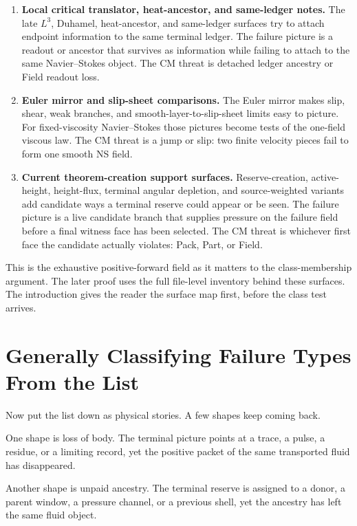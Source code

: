 \documentclass[11pt]{article}
\begin{document}
\begin{enumerate}[leftmargin=2em]
\item \textbf{Local critical translator, heat-ancestor, and same-ledger notes.}
The late \(L^3\), Duhamel, heat-ancestor, and same-ledger surfaces try to attach endpoint information to the same terminal ledger.
The failure picture is a readout or ancestor that survives as information while failing to attach to the same Navier--Stokes object.
The CM threat is detached ledger ancestry or Field readout loss.

\item \textbf{Euler mirror and slip-sheet comparisons.}
The Euler mirror makes slip, shear, weak branches, and smooth-layer-to-slip-sheet limits easy to picture.
For fixed-viscosity Navier--Stokes those pictures become tests of the one-field viscous law.
The CM threat is a jump or slip: two finite velocity pieces fail to form one smooth NS field.

\item \textbf{Current theorem-creation support surfaces.}
Reserve-creation, active-height, height-flux, terminal angular depletion, and source-weighted variants add candidate ways a terminal reserve could appear or be seen.
The failure picture is a live candidate branch that supplies pressure on the failure field before a final witness face has been selected.
The CM threat is whichever first face the candidate actually violates: Pack, Part, or Field.
\end{enumerate}

This is the exhaustive positive-forward field as it matters to the class-membership argument.
The later proof uses the full file-level inventory behind these surfaces.
The introduction gives the reader the surface map first, before the class test arrives.

\section{Generally Classifying Failure Types From the List}

Now put the list down as physical stories.
A few shapes keep coming back.

One shape is loss of body.
The terminal picture points at a trace, a pulse, a residue, or a limiting record, yet the positive packet of the same transported fluid has disappeared.

Another shape is unpaid ancestry.
The terminal reserve is assigned to a donor, a parent window, a pressure channel, or a previous shell, yet the ancestry has left the same fluid object.
\end{document}
